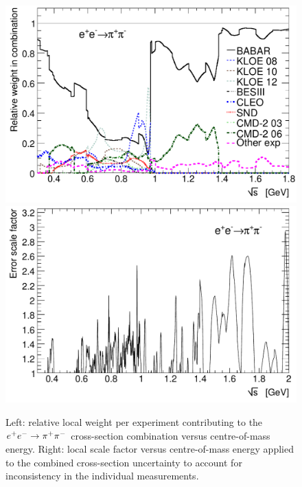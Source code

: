 \begin{figure}[p]
\vspace{1.5cm}
\includegraphics[width=\figsize]{Figures/Weights_2pi_dhmz19.pdf}\hspace{\fighspace}
\includegraphics[width=\figsize]{Figures/Chi2Correction_combined_ePeM_to_piPpiM_dhmz19.pdf}
\vspace{0.1cm}

\caption[.]{ 
            Left: relative local weight per experiment contributing to the $e^+e^-\to\pi^+\pi^-$
            cross-section combination versus centre-of-mass energy. 
            Right: local scale factor versus centre-of-mass energy applied 
            to the combined \pp cross-section uncertainty to account for inconsistency 
            in the individual measurements. }
\label{fig:weights}
\end{figure}



